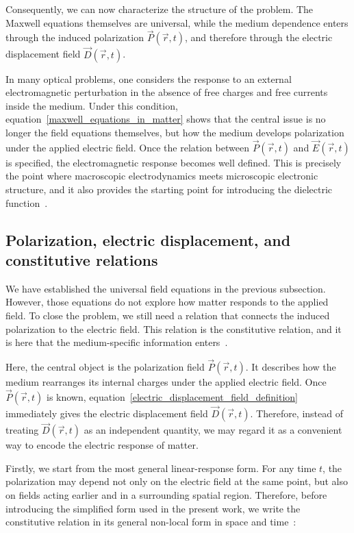 Consequently, we can now characterize the structure of the problem.
The Maxwell equations themselves are universal,
while the medium dependence enters through the induced polarization $\vec{P}(\vec{r},t)$, and therefore through the electric displacement field $\vec{D}(\vec{r},t)$.

In many optical problems, one considers the response to an external electromagnetic perturbation in the absence of free charges and free currents inside the medium.
Under this condition, equation~\eqref{maxwell_equations_in_matter} shows that the central issue is no longer the field equations themselves,
but how the medium develops polarization under the applied electric field.
Once the relation between $\vec{P}(\vec{r},t)$ and $\vec{E}(\vec{r},t)$ is specified, the electromagnetic response becomes well defined.
This is precisely the point where macroscopic electrodynamics meets microscopic electronic structure,
and it also provides the starting point for introducing the dielectric function~\cite{landau2013electrodynamics,lima2022usefulness,bernasconi2011first}.

\subsection{Polarization, electric displacement, and constitutive relations}

We have established the universal field equations in the previous subsection.
However, those equations do not explore how matter responds to the applied field.
To close the problem, we still need a relation that connects the induced polarization to the electric field.
This relation is the constitutive relation, and it is here that the medium-specific information enters~\cite{landau2013electrodynamics, lima2022usefulness}.

Here, the central object is the polarization field $\vec{P}(\vec{r},t)$.
It describes how the medium rearranges its internal charges under the applied electric field.
Once $\vec{P}(\vec{r},t)$ is known, equation~\eqref{electric_displacement_field_definition} immediately gives the electric displacement field $\vec{D}(\vec{r},t)$.
Therefore, instead of treating $\vec{D}(\vec{r},t)$ as an independent quantity, we may regard it as a convenient way to encode the electric response of matter.

Firstly, we start from the most general linear-response form.
For any time $t$, the polarization may depend not only on the electric field at the same point,
but also on fields acting earlier and in a surrounding spatial region.
Therefore, before introducing the simplified form used in the present work,
we write the constitutive relation in its general non-local form in space and time~\cite{royo2019first}:

